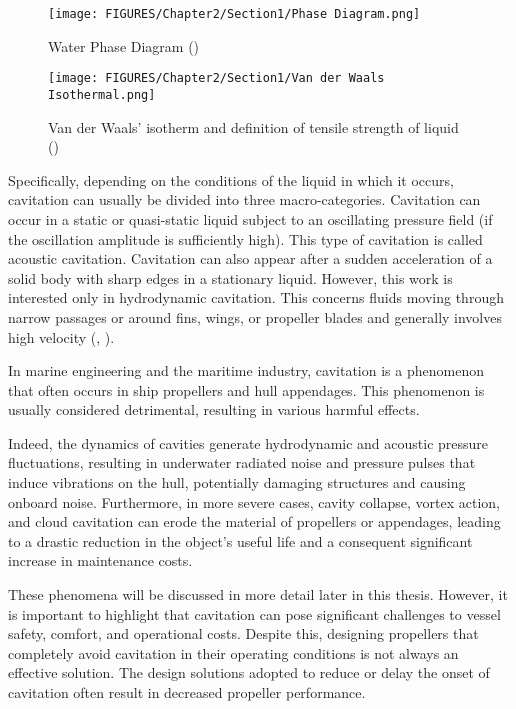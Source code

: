 \begin{figure}[htbp!]
    \centering
    \begin{minipage}{0.45\textwidth}
        \centering
        \texttt{[image: FIGURES/Chapter2/Section1/Phase Diagram.png]} 
        \caption{Water Phase Diagram (\cite{carlton2018marine})}
        \label{fig:Phase Diagram}
    \end{minipage}
    \hfill
    \begin{minipage}{0.45\textwidth}
        \centering
        \texttt{[image: FIGURES/Chapter2/Section1/Van der Waals Isothermal.png]} 
        \caption{Van der Waals’ isotherm and definition of tensile strength of liquid (\cite{carlton2018marine})}
        \label{fig:Van der Waals Isothermal}
    \end{minipage}
\end{figure}

Specifically, depending on the conditions of the liquid in which it occurs, cavitation can usually be divided into three macro-categories. 
Cavitation can occur in a static or quasi-static liquid subject to an oscillating pressure field (if the oscillation amplitude is sufficiently high). This type of cavitation is called acoustic cavitation. Cavitation can also appear after a sudden acceleration of a solid body with sharp edges in a stationary liquid. 
However, this work is interested only in hydrodynamic cavitation. This concerns fluids moving through narrow passages or around fins, wings, or propeller blades and generally involves high velocity (\cite{carlton2018marine}, \cite{franc2006fundamentals}). 

In marine engineering and the maritime industry, cavitation is a phenomenon that often occurs in ship propellers and hull appendages. This phenomenon is usually considered detrimental, resulting in various harmful effects.

Indeed, the dynamics of cavities generate hydrodynamic and acoustic pressure fluctuations, resulting in underwater radiated noise and pressure pulses that induce vibrations on the hull, potentially damaging structures and causing onboard noise. 
Furthermore, in more severe cases, cavity collapse, vortex action, and cloud cavitation can erode the material of propellers or appendages, leading to a drastic reduction in the object's useful life and a consequent significant increase in maintenance costs.

These phenomena will be discussed in more detail later in this thesis. However, it is important to highlight that cavitation can pose significant challenges to vessel safety, comfort, and operational costs. 
Despite this, designing propellers that completely avoid cavitation in their operating conditions is not always an effective solution. 
The design solutions adopted to reduce or delay the onset of cavitation often result in decreased propeller performance. 

